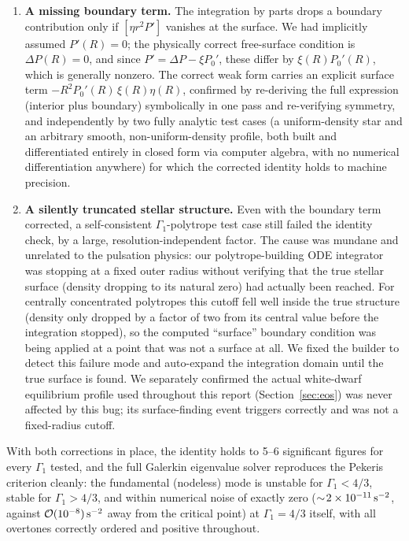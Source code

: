 \documentclass[11pt]{article}
\begin{document}
\begin{enumerate}
\item \textbf{A missing boundary term.} The integration by parts drops a boundary contribution only if $[\eta r^2 P']$ vanishes at the surface. We had implicitly assumed $P'(R)=0$; the physically correct free-surface condition is $\Delta P(R)=0$, and since $P'=\Delta P-\xi P_0'$, these differ by $\xi(R)P_0'(R)$, which is generally nonzero. The correct weak form carries an explicit surface term $-R^2P_0'(R)\,\xi(R)\eta(R)$, confirmed by re-deriving the full expression (interior plus boundary) symbolically in one pass and re-verifying symmetry, and independently by two fully analytic test cases (a uniform-density star and an arbitrary smooth, non-uniform-density profile, both built and differentiated entirely in closed form via computer algebra, with no numerical differentiation anywhere) for which the corrected identity holds to machine precision.
\item \textbf{A silently truncated stellar structure.} Even with the boundary term corrected, a self-consistent $\Gamma_1$-polytrope test case still failed the identity check, by a large, resolution-independent factor. The cause was mundane and unrelated to the pulsation physics: our polytrope-building ODE integrator was stopping at a fixed outer radius without verifying that the true stellar surface (density dropping to its natural zero) had actually been reached. For centrally concentrated polytropes this cutoff fell well inside the true structure (density only dropped by a factor of two from its central value before the integration stopped), so the computed ``surface'' boundary condition was being applied at a point that was not a surface at all. We fixed the builder to detect this failure mode and auto-expand the integration domain until the true surface is found. We separately confirmed the actual white-dwarf equilibrium profile used throughout this report (Section~\ref{sec:eos}) was never affected by this bug; its surface-finding event triggers correctly and was not a fixed-radius cutoff.
\end{enumerate}

With both corrections in place, the identity holds to 5--6 significant figures for every $\Gamma_1$ tested, and the full Galerkin eigenvalue solver reproduces the Pekeris criterion cleanly: the fundamental (nodeless) mode is unstable for $\Gamma_1<4/3$, stable for $\Gamma_1>4/3$, and within numerical noise of exactly zero ($\sim\!2\times10^{-11}\,{\rm s}^{-2}$, against $\mathcal{O}(10^{-8})\,{\rm s}^{-2}$ away from the critical point) at $\Gamma_1=4/3$ itself, with all overtones correctly ordered and positive throughout.
\end{document}
